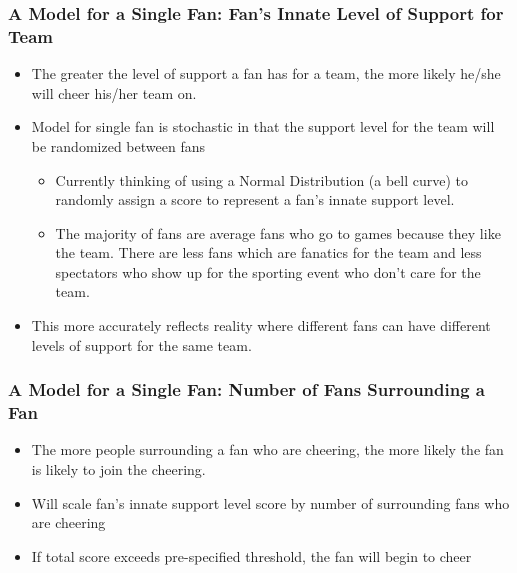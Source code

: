 \documentclass[compress,handout,10pt]{beamer}
\let\olditem\item
\renewcommand{\item}{\setlength{\itemsep}{0.5\baselineskip}\olditem}
\begin{document}
\begin {frame}
	\frametitle{A Model for a Single Fan: Fan's Innate Level of Support for Team}
	\begin{itemize}
		\item The greater the level of support a fan has for a team, the more likely he/she will cheer his/her team on.
		\item Model for single fan is stochastic in that the support level for the team will be randomized between fans
		\begin{itemize}
			\item Currently thinking of using a Normal Distribution (a bell curve) to randomly assign a score to represent a fan's innate support level.
			\item The majority of fans are average fans who go to games because they like the team. There are less fans which are fanatics for the team and less spectators who show up for the sporting event who don't care for the team.	
		\end{itemize}
		\item This more accurately reflects reality where different fans can have different levels of support for the same team.
	\end{itemize}
\end {frame}


\begin {frame}
	\frametitle {A Model for a Single Fan: Number of Fans Surrounding a Fan}
		\begin{itemize}
			\item The more people surrounding a fan who are cheering, the more likely the fan is likely to join the cheering.
			\item Will scale fan's innate support level score by number of surrounding fans who are cheering
			\item If total score exceeds pre-specified threshold, the fan will begin to cheer
		\end {itemize}
\end {frame}


	
\end{document}
